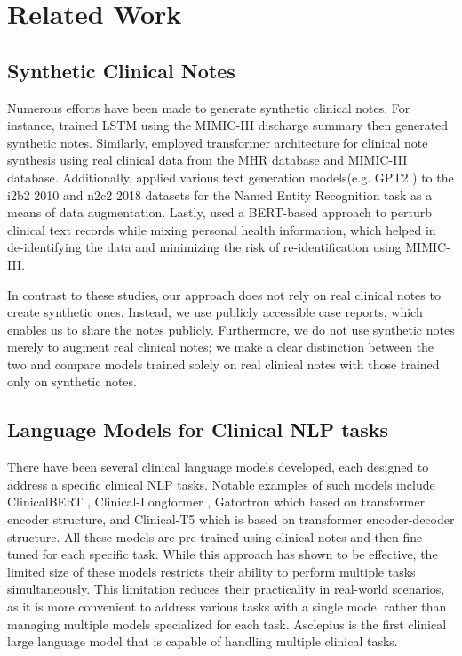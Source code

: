 \documentclass[11pt]{article}
\begin{document}
\section{Related Work}\label{Related}

\subsection{Synthetic Clinical Notes}

Numerous efforts have been made to generate synthetic clinical notes. For instance, \citet{melamud2019towards} trained LSTM \citep{hochreiter1997long} using the MIMIC-III discharge summary then generated synthetic notes. Similarly, \citet{ive2020generation} employed transformer architecture \citep{vaswani2017attention} for clinical note synthesis using real clinical data from the MHR database \citep{perera2016cohort} and MIMIC-III database. 
Additionally, \citet{li2021synthetic} applied various text generation models(e.g. GPT2 \citep{radford2019language}) to the i2b2 2010 \citep{uzuner20112010} and n2c2 2018 datasets \citep{henry20202018} for the Named Entity Recognition task as a means of data augmentation. 
Lastly, \citet{zhou2022datasiftertext} used a BERT-based approach \citep{devlin2018bert} to perturb clinical text records while mixing personal health information, which helped in de-identifying the data and minimizing the risk of re-identification using MIMIC-III.

In contrast to these studies, our approach does not rely on real clinical notes to create synthetic ones. Instead, we use publicly accessible case reports, which enables us to share the notes publicly. Furthermore, we do not use synthetic notes merely to augment real clinical notes; we make a clear distinction between the two and compare models trained solely on real clinical notes with those trained only on synthetic notes.

\subsection{Language Models for Clinical NLP tasks}

There have been several clinical language models developed, each designed to address a specific clinical NLP tasks.
Notable examples of such models include ClinicalBERT \citep{alsentzer2019publicly}, Clinical-Longformer \citep{li2023comparative}, Gatortron \citep{yang2022large} which based on transformer encoder structure, and Clinical-T5 \citep{lehman2023we} which is based on transformer encoder-decoder structure. 
All these models are pre-trained using clinical notes and then fine-tuned for each specific task.  
While this approach has shown to be effective, the limited size of these models restricts their ability to perform multiple tasks simultaneously. 
This limitation reduces their practicality in real-world scenarios, as it is more convenient to address various tasks with a single model rather than managing multiple models specialized for each task.
Asclepius is the first clinical large language model that is capable of handling multiple clinical tasks.
    
\end{document}
